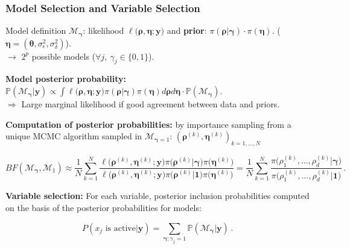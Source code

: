 \documentclass[nopagenumber,9pt]{beamer}
\renewcommand{\P}{\mathbb{P}}
\newcommand{\btheta}{\boldsymbol{\theta}}
\newcommand{\by}{\mathbf{y}}
\newcommand{\brho}{\boldsymbol{\rho}}
\newcommand{\bgamma}{\boldsymbol{\gamma}}
\newcommand{\bsigma}{\boldsymbol{\sigma}}
\newcommand{\bneta}{\boldsymbol{\eta}}
\newcommand{\M}{\mathcal{M}}
\begin{document}
\begin{frame}
\frametitle{Model Selection and Variable Selection}
 \begin{beamerboxesrounded}{Model definition}
 $\M_{\bgamma}$: likelihood $\ell\big(\brho,\bneta;\by \big)$ and
\textbf{prior}: $\pi(\brho|\bgamma)\cdot \pi(\bneta)$. ($\bneta=(\btheta,\sigma^2_\epsilon,\sigma^2_\delta)$).\\
$\rightarrow$ $2^p$ possible models ($\forall j,\ \gamma_j\in\{0,1\}$).
  \end{beamerboxesrounded}



 \bigskip

 \textbf{Model posterior probability:}
 $\P(\M_{\bgamma}|\by) \propto \int \ell\big(\brho,\bneta;\by \big) \pi(\brho|\bgamma) \pi(\bneta) d\brho d\bneta\cdot \P(\M_{\bgamma})$.
 \\
 $\Rightarrow$ Large marginal likelihood if good agreement between data and priors.


 \bigskip


 \textbf{Computation of posterior probabilities:} by importance sampling from a unique MCMC algorithm sampled in $\M_{\bgamma=1}$: $ \left(\brho^{(k)},\bneta^{(k)}\right)_{k=1,\ldots,N}$

 $$BF(\M_{\bgamma},\M_1) \approx \frac{1}{N}\sum_{k=1}^N \frac{\ell\big(\brho^{(k)},\bneta^{(k)};\by\big)\pi\big(\brho^{(k)}|{\bgamma}\big)\pi\big(\bneta^{(k)}\big)}{\ell\big(\brho^{(k)},\bneta^{(k)};\by\big)\pi\big(\brho^{(k)}|\boldsymbol{1}\big)\pi\big(\bneta^{(k)}\big)}=\frac{1}{N}\sum_{k=1}^N\frac{\pi\big(\rho_1^{(k)},\ldots,\rho_d^{(k)}|{\bgamma}\big)}{\pi\big(\rho_1^{(k)},\ldots,\rho_d^{(k)}|\boldsymbol{1}\big)}\,.$$

 \textbf{Variable selection:}
For each variable, posterior inclusion probabilities computed on the basis of the posterior probabilities for models:

$$P(x_j \text{ is active}|\by)= \sum_{\bgamma:\gamma_j=1}\P(\M_{\bgamma}|\by)\,.$$

 \end{frame}
%
%
%
%
%
%
%
%
\end{document}
